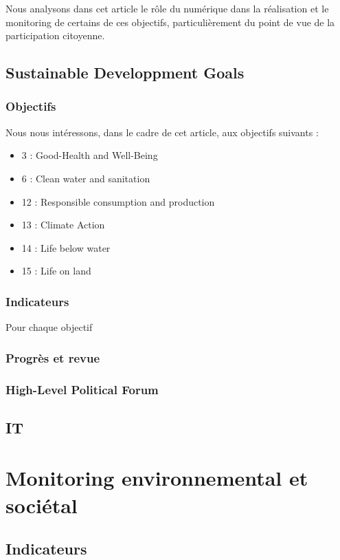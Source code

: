 \documentclass[a4paper,11pt,titlepage]{article}
\begin{document}
		Nous analysons dans cet article le rôle du numérique dans la réalisation et le monitoring de certains de ces objectifs, particulièrement du point de vue de la participation citoyenne.
		 
		\subsection{Sustainable Developpment Goals}
			\subsubsection{Objectifs}
				Nous nous intéressons, dans le cadre de cet article, aux objectifs suivants :
				\begin{itemize}
					\item 3 : Good-Health and Well-Being
					\item 6 : Clean water and sanitation
					\item 12 : Responsible consumption and production
					\item 13 : Climate Action
					\item 14 : Life below water
					\item 15 : Life on land
				\end{itemize}

			\subsubsection{Indicateurs}
			Pour chaque objectif
			\subsubsection{Progrès et revue}
			\subsubsection{High-Level Political Forum}
			
		\subsection{IT}
	
	\section{Monitoring environnemental et sociétal}
		\subsection{Indicateurs}
\end{document}
